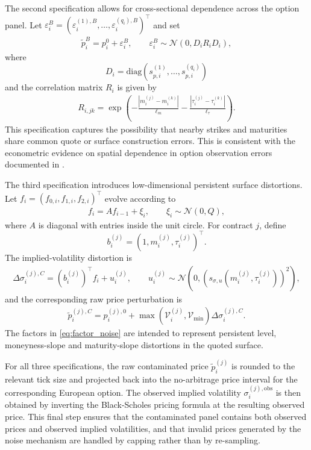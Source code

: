 \documentclass[11pt,a4paper,notitlepage]{article}
\numberwithin{equation}{section}
\begin{document}
The second specification allows for cross-sectional dependence across the option panel. Let
$\varepsilon_i^B=\left(\varepsilon_i^{(1),B},\ldots,\varepsilon_i^{(q_i),B}\right)^\top$ and set
\begin{align}
\tilde p_i^{B}=p_i^{0}+\varepsilon_i^B,
\qquad
\varepsilon_i^B\sim\mathcal{N}(0,D_i R_i D_i),
\label{eq:noise_spatial}
\end{align}
where
\[
D_i=\mathrm{diag}\left(s_{p,i}^{(1)},\ldots,s_{p,i}^{(q_i)}\right)
\]
and the correlation matrix $R_i$ is given by
\begin{align}
R_{i,jk}
=
\exp\left(
-\frac{|m_i^{(j)}-m_i^{(k)}|}{\ell_m}
-\frac{|\tau_i^{(j)}-\tau_i^{(k)}|}{\ell_\tau}
\right).
\label{eq:spatial_kernel}
\end{align}
This specification captures the possibility that nearby strikes and maturities share common quote or surface
construction errors. This is consistent with the econometric evidence on spatial dependence in option observation
errors documented in \citet{andersen2021spatial}.

The third specification introduces low-dimensional persistent surface distortions. Let
$f_i=(f_{0,i},f_{1,i},f_{2,i})^\top$ evolve according to
\begin{align}
f_i=A f_{i-1}+\xi_i,
\qquad
\xi_i\sim\mathcal{N}(0,Q),
\label{eq:factor_noise}
\end{align}
where $A$ is diagonal with entries inside the unit circle. For contract $j$, define
\[
b_i^{(j)}=\left(1,m_i^{(j)},\tau_i^{(j)}\right)^\top.
\]
The implied-volatility distortion is
\begin{align}
\Delta\sigma_i^{(j),C}
=
\left(b_i^{(j)}\right)^\top f_i + u_i^{(j)},
\qquad
u_i^{(j)}\sim\mathcal{N}\left(0,\left(s_{\sigma,u}(m_i^{(j)},\tau_i^{(j)})\right)^2\right),
\label{eq:factor_iv_noise}
\end{align}
and the corresponding raw price perturbation is
\begin{align}
\tilde p_i^{(j),C}
=
p_i^{(j),0}
+
\max\left(\mathcal{V}_i^{(j)},\mathcal{V}_{\min}\right)
\Delta\sigma_i^{(j),C}.
\label{eq:factor_price_noise}
\end{align}
The factors in \eqref{eq:factor_noise} are intended to represent persistent level, moneyness-slope and maturity-slope
distortions in the quoted surface.

For all three specifications, the raw contaminated price $\tilde p_i^{(j)}$ is rounded to the relevant tick size
and projected back into the no-arbitrage price interval for the corresponding European option. The observed implied
volatility $\sigma_i^{(j),\mathrm{obs}}$ is then obtained by inverting the Black-Scholes pricing formula at the
resulting observed price. This final step ensures that the contaminated panel contains both observed prices and
observed implied volatilities, and that invalid prices generated by the noise mechanism are handled by capping rather
than by re-sampling.
\end{document}
